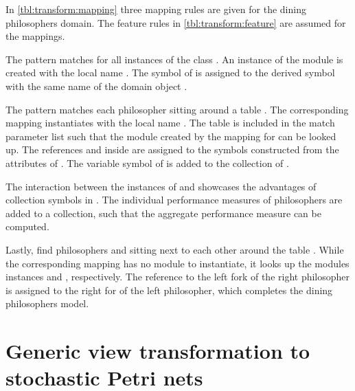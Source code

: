 \begin{table}
\begin{tabular}{@{}>{\centering\arraybackslash}m{}@{}m{}@{}>{\centering\arraybackslash}m{}@{}}
    \bottomrule
  \end{tabular}
\end{table}

\begin{runningExample}\label{ex:transform:mapping}
  In \vref{tbl:transform:mapping} three mapping rules are given for the dining philosophers domain. The feature rules in \vref{tbl:transform:feature} are assumed for the mappings.

  The pattern  matches for all instances  of the class . An instance of the module  is created with the local name . The symbol  of  is assigned to the derived symbol with the same name of the domain object .

  The pattern  matches each philosopher  sitting around a table . The corresponding mapping instantiates  with the local name . The table  is included in the match parameter list such that the module  created by the mapping  for  can be looked up. The references  and  inside  are assigned to the symbols constructed from the attributes of . The variable symbol  of  is added to the collection  of .

  The interaction between the instances of  and  showcases the advantages of collection symbols in . The individual performance measures  of philosophers are added to a collection, such that the aggregate performance measure  can be computed.

  Lastly,  find philosophers  and  sitting next to each other around the table . While the corresponding mapping has no  module to instantiate, it looks up the modules instances  and , respectively. The reference to the left fork of the right philosopher is assigned to the right for of the left philosopher, which completes the dining philosophers model.
\end{runningExample}

\section{Generic view transformation to stochastic Petri nets}
\label{chap:transform:view}

